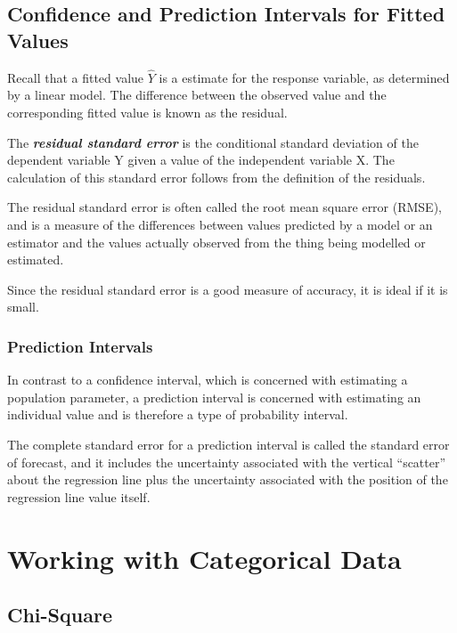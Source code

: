 \documentclass[a4paper,12pt]{article}
\begin{document}
\begin{itemize}
\begin{itemize}
		
		\subsection{Confidence and Prediction Intervals for Fitted Values} 
		
		Recall that a fitted value $\hat{Y}$ is a estimate for the response variable, as determined by a linear model. The difference between the observed value and the corresponding fitted value is known as the residual.
		
		The \textbf{\emph{residual standard error}} is the conditional standard deviation of the dependent variable Y given a value of the independent variable X. The calculation of this standard error follows from the definition of the residuals.
		
		The residual standard error is often called the root mean square error (RMSE), and is a measure of the differences between values predicted by a model or an estimator and the values actually observed from the thing being modelled or estimated.
		
		Since the residual standard error is a good measure of accuracy, it is ideal if it is small.
		
		\subsubsection{Prediction Intervals}
		In contrast to a confidence interval, which is concerned with estimating a population parameter, a prediction interval is concerned with estimating an individual value and is therefore a type of probability interval. 
		
		The complete standard error for a prediction interval is called the standard error of forecast, and it includes the uncertainty associated with the vertical “scatter” about the regression line plus the uncertainty associated with the position of the regression line value itself.
		
		
		
		
		
		
		
		
		
		\newpage
		\section{Working with Categorical Data}
		\subsection{Chi-Square}
		

\end{itemize}
\end{itemize}
\end{document}
